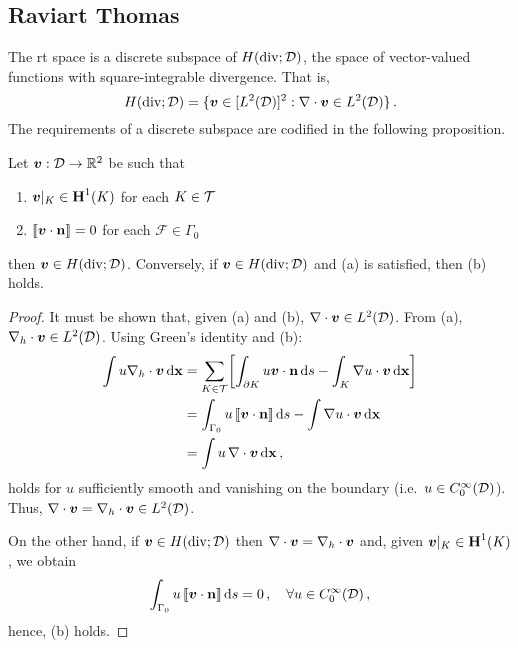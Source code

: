 \documentclass[../doc.tex]{subfiles}
\begin{document}
\subsection{Raviart Thomas} \label{fem_sec:fes_rt}
The \gls{rt} space \cite{Raviart1977,raviart_thomas} is a discrete subspace of $H(\operatorname{div};\mathcal{D})$, the space of vector-valued functions with square-integrable divergence. That is, 
	\begin{equation}
		H(\operatorname{div};\mathcal{D}) = \{ \boldsymbol{v} \in [L^2(\mathcal{D})]^2 : \nabla\cdot\boldsymbol{v} \in L^2(\mathcal{D}) \} \,. 
	\end{equation}
The requirements of a discrete subspace are codified in the following proposition. 
\begin{prop} \label{fem:div_prop}
Let $\boldsymbol{v} : \mathcal{D} \rightarrow \mathbb{R}^2$ be such that 
\begin{enumerate}
	\item $\boldsymbol{v}|_K \in \boldsymbol{\mathrm{H}}^1(K)$ for each $K \in \mathcal{T}$  
	\item $\left\llbracket\boldsymbol{v}\cdot\boldsymbol{\mathrm{n}} \right\rrbracket = 0$ for each $\mathcal{F} \in \Gamma_0$ 
\end{enumerate}
then $\boldsymbol{v} \in H(\operatorname{div};\mathcal{D})$. Conversely, if $\boldsymbol{v} \in H(\operatorname{div};\mathcal{D})$ and (a) is satisfied, then (b) holds. 
\end{prop}
\begin{proof}
It must be shown that, given (a) and (b), $\nabla\cdot\boldsymbol{v} \in L^2(\mathcal{D})$. From (a), $\nabla_h\cdot\boldsymbol{v} \in L^2(\mathcal{D})$. Using Green's identity and (b): 
	\begin{equation}
	\begin{aligned}
		\int u\nabla_h\cdot\boldsymbol{v} \mathop{}\!\mathrm{d} \boldsymbol{\mathrm{x}} &= \sum_{K\in\mathcal{T}} \!\left[ \int_{\partial K} u \boldsymbol{v}\cdot\boldsymbol{\mathrm{n}} \mathop{}\!\mathrm{d} s - \int_K \nabla u \cdot \boldsymbol{v} \mathop{}\!\mathrm{d} \boldsymbol{\mathrm{x}}  \right] \\
		&= \int_{\Gamma_0} u \left\llbracket\boldsymbol{v}\cdot\boldsymbol{\mathrm{n}} \right\rrbracket \mathop{}\!\mathrm{d} s - \int \nabla u \cdot \boldsymbol{v} \mathop{}\!\mathrm{d} \boldsymbol{\mathrm{x}} \\
		&= \int u\, \nabla\cdot\boldsymbol{v} \mathop{}\!\mathrm{d} \boldsymbol{\mathrm{x}} \,, 
	\end{aligned}
	\end{equation}
holds for $u$ sufficiently smooth and vanishing on the boundary (i.e.~$u \in C_0^\infty(\mathcal{D})$). Thus, $\nabla\cdot\boldsymbol{v} = \nabla_h\cdot\boldsymbol{v} \in L^2(\mathcal{D})$. 

On the other hand, if $\boldsymbol{v} \in H(\operatorname{div};\mathcal{D})$ then $\nabla\cdot\boldsymbol{v} = \nabla_h\cdot\boldsymbol{v}$ and, given $\boldsymbol{v}|_K \in \boldsymbol{\mathrm{H}}^1(K)$, we obtain 
	\begin{equation}
		\int_{\Gamma_0} u \left\llbracket\boldsymbol{v}\cdot\boldsymbol{\mathrm{n}} \right\rrbracket \mathop{}\!\mathrm{d} s = 0 \,, \quad \forall u \in C_0^\infty(\mathcal{D}) \,, 
	\end{equation}
hence, (b) holds.
\end{proof}
\end{document}
